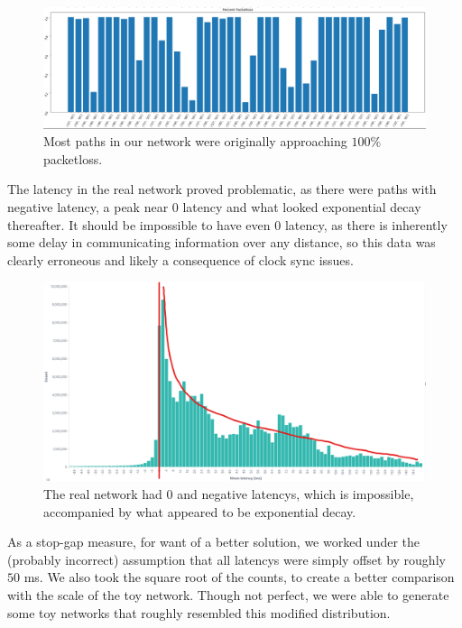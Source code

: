 \documentclass{finalreport}
\begin{document}
\begin{figure}[!ht]
\centering
\includegraphics[width=.85\linewidth]{final/toypacketloss.png}
\caption{Most paths in our network were originally approaching $100\%$ \gls{packetloss}.}
\end{figure}

The \gls{latency} in the real network proved problematic, as there were paths with negative latency, a peak near $0$ latency and what looked exponential decay thereafter. It should be impossible to have even $0$ latency, as there is inherently some delay in communicating information over any distance, so this data was clearly erroneous and likely a consequence of clock sync issues. 

\pagebreak
\begin{figure}[!ht]
\centering
\includegraphics[width=.85\linewidth]{week_4/ExponentialDecay.png}
\caption{The real network had $0$ and negative \glspl{latency}, which is impossible, accompanied by what appeared to be exponential decay.}
\end{figure}

As a stop-gap measure, for want of a better solution, we worked under the (probably incorrect) assumption that all \glspl{latency} were simply offset by roughly $50$ ms. We also took the square root of the counts, to create a better comparison with the scale of the toy network. Though not perfect, we were able to generate some toy networks that roughly resembled this modified distribution.
\end{document}
